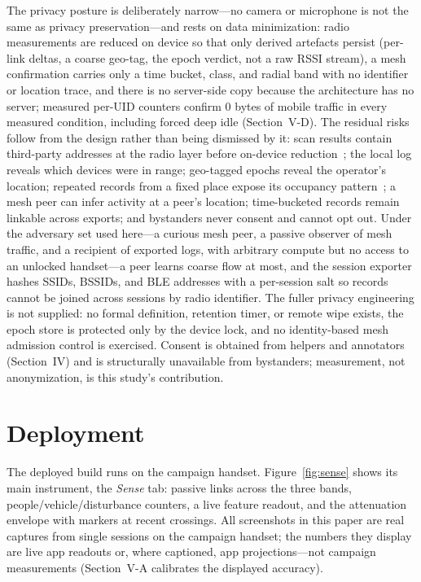 \documentclass[journal,10pt]{IEEEtran}
\begin{document}
The privacy posture is deliberately narrow---no camera or microphone is not
the same as privacy preservation---and rests on data minimization: radio
measurements are reduced on device so that only derived artefacts persist
(per-link deltas, a coarse geo-tag, the epoch verdict, not a raw RSSI stream),
a mesh confirmation carries only a time bucket, class, and radial band with no
identifier or location trace, and there is no server-side copy because the
architecture has no server; measured per-UID counters confirm $0$ bytes of
mobile traffic in every measured condition, including forced deep idle
(Section~V-D). The residual risks follow from the design rather than being
dismissed by it: scan results contain third-party addresses at the radio layer
before on-device reduction~\cite{casar2022,ryan2013woot}; the local log reveals
which devices were in range; geo-tagged epochs reveal the operator's location;
repeated records from a fixed place expose its occupancy
pattern~\cite{beresford2003}; a mesh peer can infer activity at a peer's
location; time-bucketed records remain linkable across exports; and bystanders
never consent and cannot opt out. Under the adversary set used here---a curious
mesh peer, a passive observer of mesh traffic, and a recipient of exported
logs, with arbitrary compute but no access to an unlocked handset---a peer
learns coarse flow at most, and the session exporter hashes SSIDs, BSSIDs, and
BLE addresses with a per-session salt so records cannot be joined across
sessions by radio identifier. The fuller privacy engineering is not supplied:
no formal definition, retention timer, or remote wipe exists, the epoch store
is protected only by the device lock, and no identity-based mesh admission
control is exercised. Consent is obtained from helpers and annotators
(Section~IV) and is structurally unavailable from bystanders; measurement, not
anonymization, is this study's contribution.

\section{Deployment}
The deployed build runs on the campaign handset. Figure~\ref{fig:sense} shows
its main instrument, the \emph{Sense} tab: passive links across the three
bands, people/vehicle/disturbance counters, a live feature readout, and the
attenuation envelope with markers at recent crossings. All screenshots in this
paper are real captures from single sessions on the campaign handset; the
numbers they display are live app readouts or, where captioned, app
projections---not campaign measurements (Section~V-A calibrates the displayed
accuracy).
\end{document}
